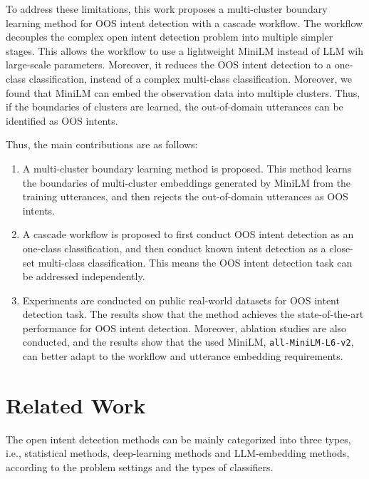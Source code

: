 \documentclass[11pt]{article}
\begin{document}
To address these limitations, this work proposes a multi-cluster boundary learning method for OOS intent detection with a cascade workflow. The workflow decouples the complex open intent detection problem into multiple simpler stages. This allows the workflow to use a lightweight MiniLM instead of LLM wih large-scale parameters. Moreover, it reduces the OOS intent detection to a one-class classification, instead of a complex multi-class classification. Moreover, we found that MiniLM can embed the observation data into multiple clusters. Thus, if the boundaries of clusters are learned, the out-of-domain utterances can be identified as OOS intents.

Thus, the main contributions are as follows:
\begin{enumerate}
    \item[1.] A multi-cluster boundary learning method is proposed. This method learns the boundaries of multi-cluster embeddings generated by MiniLM from the training utterances, and then rejects the out-of-domain utterances as OOS intents. 
    
    \item[2.] A cascade workflow is proposed to first conduct OOS intent detection as an one-class classification, and then conduct known intent detection as a close-set multi-class classification. This means the OOS intent detection task can be addressed independently. 

    \item[3] Experiments are conducted on public real-world datasets for OOS intent detection task. The results show that the method achieves the state-of-the-art performance for OOS intent detection. Moreover, ablation studies are also conducted, and the results show that the used MiniLM, \texttt{all-MiniLM-L6-v2}, can better adapt to the workflow and utterance embedding requirements.  
\end{enumerate}

\section{Related Work}
The open intent detection methods can be mainly categorized into three types, i.e., statistical methods, deep-learning methods and LLM-embedding methods, according to the problem settings and the types of classifiers.
\end{document}
